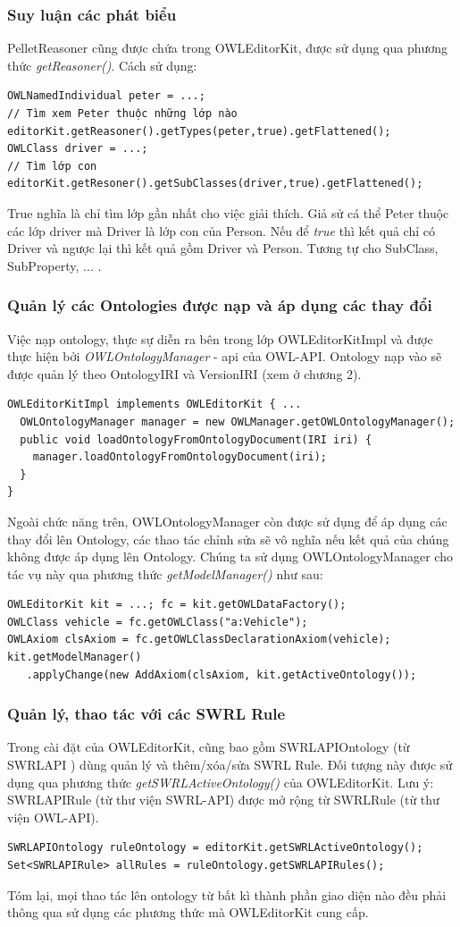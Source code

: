 {\subsubsection{Suy luận các phát biểu}
PelletReasoner cũng được chứa trong OWLEditorKit, được sử dụng qua phương thức \textit{getReasoner()}. Cách sử dụng:
\begin{verbatim}
OWLNamedIndividual peter = ...; 
// Tìm xem Peter thuộc những lớp nào
editorKit.getReasoner().getTypes(peter,true).getFlattened();
OWLClass driver = ...;
// Tìm lớp con 
editorKit.getResoner().getSubClasses(driver,true).getFlattened();
\end{verbatim}
True nghĩa là chỉ tìm lớp gần nhất cho việc giải thích. Giả sử cá thể Peter thuộc các lớp driver mà Driver là lớp con của Person. Nếu để \textit{true} thì kết quả chỉ có Driver và ngược lại thì kết quả gồm Driver và Person. Tương tự cho SubClass, SubProperty, ... .
\subsubsection{Quản lý các Ontologies được nạp và áp dụng các thay đổi}
Việc nạp ontology, thực sự diễn ra bên trong lớp OWLEditorKitImpl và được thực hiện bởi \textit{OWLOntologyManager} - api của OWL-API.  Ontology nạp vào sẽ được quản lý theo OntologyIRI và VersionIRI (xem ở chương 2).
\begin{verbatim}
OWLEditorKitImpl implements OWLEditorKit { ...
  OWLOntologyManager manager = new OWLManager.getOWLOntologyManager();
  public void loadOntologyFromOntologyDocument(IRI iri) {
  	manager.loadOntologyFromOntologyDocument(iri);
  }
}
\end{verbatim}
Ngoài chức năng trên, OWLOntologyManager còn được sử dụng để áp dụng các thay đổi lên Ontology, các thao tác chỉnh sửa sẽ vô nghĩa nếu kết quả của chúng không được áp dụng lên Ontology. Chúng ta sử dụng OWLOntologyManager cho tác vụ này qua phương thức \textit{getModelManager()} như sau:
\begin{verbatim}
OWLEditorKit kit = ...; fc = kit.getOWLDataFactory();
OWLClass vehicle = fc.getOWLClass("a:Vehicle"); 
OWLAxiom clsAxiom = fc.getOWLClassDeclarationAxiom(vehicle);
kit.getModelManager()
   .applyChange(new AddAxiom(clsAxiom, kit.getActiveOntology());
\end{verbatim}
\subsubsection{Quản lý, thao tác với các SWRL Rule}
Trong cài đặt của OWLEditorKit, cũng bao gồm SWRLAPIOntology (từ SWRLAPI \cite{swrlapi}) dùng quản lý và thêm/xóa/sửa SWRL Rule. Đối tượng này được sử dụng qua phương thức \textit{getSWRLActiveOntology()} của OWLEditorKit. Lưu ý: SWRLAPIRule (từ thư viện SWRL-API) được mở rộng từ SWRLRule (từ thư viện OWL-API).
\begin{verbatim}
SWRLAPIOntology ruleOntology = editorKit.getSWRLActiveOntology();
Set<SWRLAPIRule> allRules = ruleOntology.getSWRLAPIRules();
\end{verbatim}
Tóm lại, mọi thao tác lên ontology từ bất kì thành phần giao diện nào đều phải thông qua sử dụng các phương thức mà OWLEditorKit cung cấp.

}
